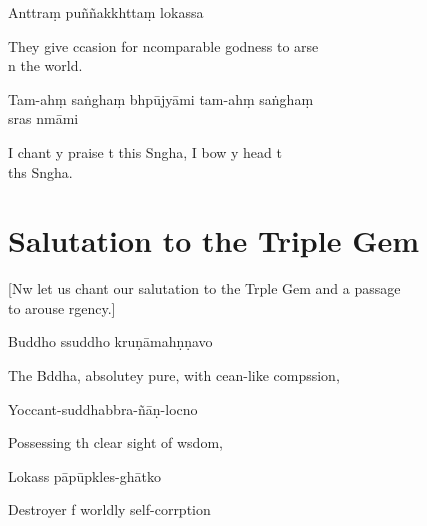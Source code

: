 Anttraṃ puññakkhttaṃ lokassa

\begin{english}
  They give ccasion for ncomparable godness to arse \\n the world.
\end{english}

Tam-ahṃ saṅghaṃ bhpūjyāmi tam-ahṃ saṅghaṃ \\s{}ras nmāmi

\begin{english}
  I chant y praise t this Sngha, I bow y head t\\ ths Sngha.
\end{english}


\chapter{Salutation to the Triple Gem}

\begin{leader}
\end{leader}

\begin{english}
  [Nw let us chant our salutation to the Trple Gem and a passage \\to arouse rgency.]
\end{english}

Buddho ssuddho kruṇāmahṇṇavo

\begin{english}
  The Bddha, absolutey pure, with cean-like compssion,
\end{english}

Yoccant-suddhabbra-ñāṇ-locno

\begin{english}
  Possessing th clear sight of wsdom,
\end{english}

Lokass pāpūpkles-ghātko

\begin{english}
  Destroyer f worldly self-corrption
\end{english}

